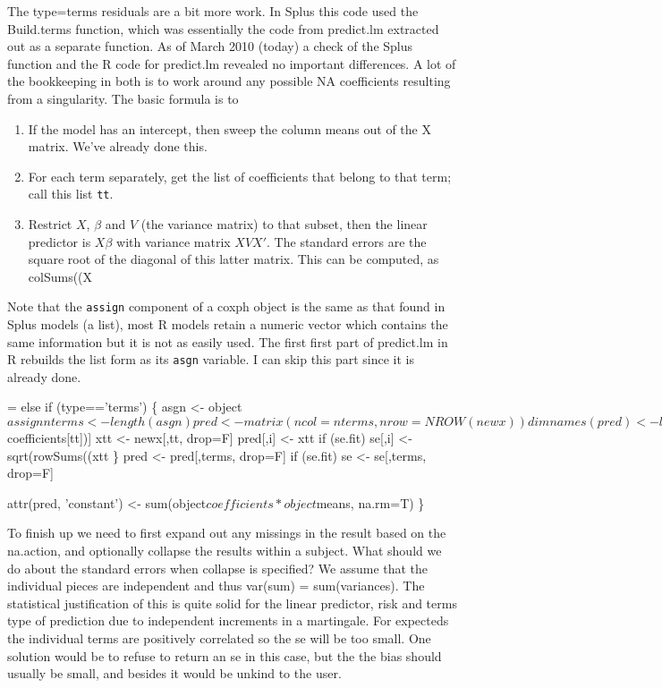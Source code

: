 \documentclass{article}
\newcommand{\code}[1]{\texttt{#1}}
\begin{document}
The type=terms residuals are a bit more work.  
In Splus this code used the Build.terms function, which was essentially
the code from predict.lm extracted out as a separate function.  
As of March 2010 (today) a check of the Splus function and the R code
for predict.lm revealed no important differences.  
A lot of the bookkeeping in both is to work around any possible NA
coefficients resulting from a singularity.
The basic formula is to
\begin{enumerate}
  \item If the model has an intercept, then sweep the column means
    out of the X matrix.  We've already done this.
  \item For each term separately, get the list of coefficients that
    belong to that term; call this list \code{tt}.
  \item Restrict $X$, $\beta$ and $V$ (the variance matrix) to that
    subset, then the linear predictor is $X\beta$ with variance
    matrix $X V X'$.  The standard errors are the square root of 
    the diagonal of this latter matrix.  This can be computed,
    as colSums((X %
\end{enumerate}
Note that the \code{assign} component of a coxph object is the same
as that found in Splus models (a list), most R models retain a numeric vector
which contains the same information but it is not as easily used.  The first
first part of predict.lm in R rebuilds the list form as its \code{asgn} variable.
I can skip this part since it is already done.
\begin{nwchunk}
=
 else if (type=='terms') \{ 
     asgn <- object$assign
     nterms<-length(asgn)
     pred<-matrix(ncol=nterms,nrow=NROW(newx))
     dimnames(pred) <- list(rownames(newx), names(asgn))
     if (se.fit) se <- pred
     
     for (i in 1:nterms) \{
         tt <- asgn[[i]]
         tt <- tt[!is.na(object$coefficients[tt])]
         xtt <- newx[,tt, drop=F]
         pred[,i] <- xtt %
         if (se.fit)
             se[,i] <- sqrt(rowSums((xtt %
         \}
     pred <- pred[,terms, drop=F]
     if (se.fit) se <- se[,terms, drop=F]
     
     attr(pred, 'constant') <- sum(object$coefficients*object$means, na.rm=T)
     \}
\end{nwchunk}

To finish up we need to first expand out any missings in the result
based on the na.action, and optionally collapse the results within
a subject.
What should we do about the standard errors when collapse is specified?
We assume that the individual pieces are
independent and thus var(sum) = sum(variances).  
The statistical justification of this is quite solid for the linear predictor,
risk and terms type of prediction due to independent increments in a martingale.
For expecteds the individual terms are positively correlated so the se will
be too small.  One solution would be to refuse to return an se in this
case, but the the bias should usually be small, 
and besides it would be unkind to the user.
\end{document}
